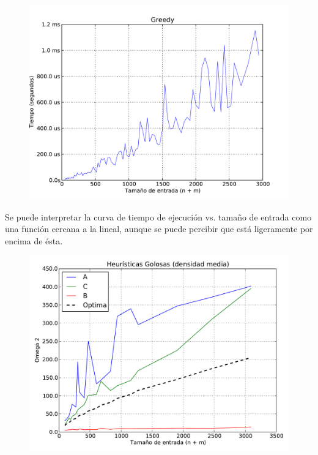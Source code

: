 \begin{figure}[H]
\begin{center}
\includegraphics[angle=0, scale=.75]{imagenes/tiempos_greedy_magic/greedy_A_2014-06-27_02-37-46.pdf}
\label{grafico local}
\end{center}
\end{figure}

Se puede interpretar la curva de tiempo de ejecución vs. tamaño de entrada como una función cercana a la lineal, aunque se puede percibir
que está ligeramente por encima de ésta.

\begin{figure}[H]
\begin{center}
\includegraphics[angle=0, scale=.75]{imagenes/calidad_greedy_2014-06-27_09-50-48.pdf}
\label{grafico local}
\end{center}
\end{figure}

